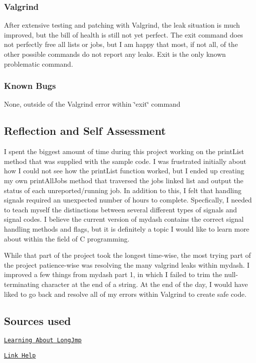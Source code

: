 \subsubsection*{Valgrind}

After extensive testing and patching with Valgrind, the leak situation is much improved, but the bill of health is still not yet perfect. The exit command does not perfectly free all lists or jobs, but I am happy that most, if not all, of the other possible commands do not report any leaks. Exit is the only known problematic command.

\subsubsection*{Known Bugs}

None, outside of the Valgrind error within \char`\"{}exit\char`\"{} command

\subsection*{Reflection and Self Assessment}

I spent the biggest amount of time during this project working on the print\-List method that was supplied with the sample code. I was frustrated initially about how I could not see how the print\-List function worked, but I ended up creating my own print\-All\-Jobs method that traversed the jobs linked list and output the status of each unreported/running job. In addition to this, I felt that handling signals required an unexpected number of hours to complete. Specfically, I needed to teach myself the distinctions between several different types of signals and signal codes. I believe the current version of mydash contains the correct signal handling methods and flags, but it is definitely a topic I would like to learn more about within the field of C programming.

While that part of the project took the longest time-\/wise, the most trying part of the project patience-\/wise was resolving the many valgrind leaks within mydash. I improved a few things from mydash part 1, in which I failed to trim the null-\/terminating character at the end of a string. At the end of the day, I would have liked to go back and resolve all of my errors within Valgrind to create safe code.

\subsection*{Sources used}

\href{https://stackoverflow.com/questions/16828378/readline-get-a-new-prompt-on-sigint}{\tt Learning About Long\-Jmp}

\href{https://github.com/adam-p/markdown-here/wiki/Markdown-Cheatsheet#links}{\tt Link Help} 